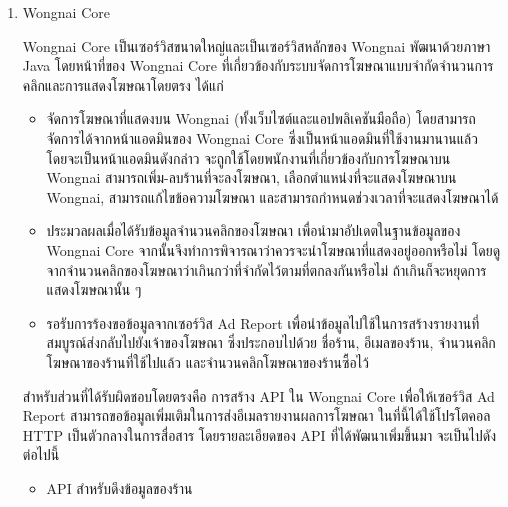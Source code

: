 \begin{enumerate}
	\item Wongnai Core
	
	Wongnai Core เป็นเซอร์วิสขนาดใหญ่และเป็นเซอร์วิสหลักของ Wongnai พัฒนาด้วยภาษา Java โดยหน้าที่ของ Wongnai Core ที่เกี่ยวข้องกับระบบจัดการโฆษณาแบบจำกัดจำนวนการคลิกและการแสดงโฆษณาโดยตรง ได้แก่
	
	\begin{itemize}
		\item จัดการโฆษณาที่แสดงบน Wongnai (ทั้งเว็บไซต์และแอปพลิเคชันมือถือ) โดยสามารถจัดการได้จากหน้าแอดมินของ Wongnai Core ซึ่งเป็นหน้าแอดมินที่ใช้งานมานานแล้ว โดยจะเป็นหน้าแอดมินดังกล่าว จะถูกใช้โดยพนักงานที่เกี่ยวข้องกับการโฆษณาบน Wongnai สามารถเพิ่ม-ลบร้านที่จะลงโฆษณา, เลือกตำแหน่งที่จะแสดงโฆษณาบน Wongnai, สามารถแก้ไขข้อความโฆษณา และสามารถกำหนดช่วงเวลาที่จะแสดงโฆษณาได้
		\item ประมวลผลเมื่อได้รับข้อมูลจำนวนคลิกของโฆษณา เพื่อนำมาอัปเดตในฐานข้อมูลของ Wongnai Core จากนั้นจึงทำการพิจารณาว่าควรจะนำโฆษณาที่แสดงอยู่ออกหรือไม่ โดยดูจากจำนวนคลิกของโฆษณาว่าเกินกว่าที่จำกัดไว้ตามที่ตกลงกันหรือไม่ ถ้าเกินก็จะหยุดการแสดงโฆษณานั้น ๆ
		\item รอรับการร้องขอข้อมูลจากเซอร์วิส Ad Report เพื่อนำข้อมูลไปใช้ในการสร้างรายงานที่สมบูรณ์ส่งกลับไปยังเจ้าของโฆษณา ซึ่งประกอบไปด้วย ชื่อร้าน, อีเมลของร้าน, จำนวนคลิกโฆษณาของร้านที่ใช้ไปแล้ว และจำนวนคลิกโฆษณาของร้านซื้อไว้
	\end{itemize}

	สำหรับส่วนที่ได้รับผิดชอบโดยตรงคือ การสร้าง API ใน Wongnai Core เพื่อให้เซอร์วิส Ad Report สามารถขอข้อมูลเพิ่มเติมในการส่งอีเมลรายงานผลการโฆษณา ในที่นี้ได้ใช้โปรโตคอล HTTP เป็นตัวกลางในการสื่อสาร โดยรายละเอียดของ API ที่ได้พัฒนาเพิ่มขึ้นมา จะเป็นไปดังต่อไปนี้
	
	\begin{itemize}
		\item API สำหรับดึงข้อมูลของร้าน
		

\end{itemize}
\end{enumerate}
